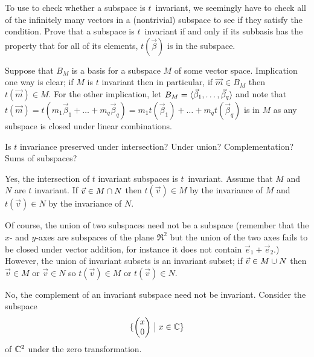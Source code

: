\begin{exercises}
    To use  to check whether a subspace
    is $t$~invariant, we seemingly have to check all of the infinitely many
    vectors in a (nontrivial) subspace to see if they satisfy the condition.
    Prove that a subspace is \( t \)~invariant if and only if its subbasis
    has the property that for all of its elements, $t(\vec{\beta})$ is in 
    the subspace.
    \begin{answer}
      Suppose that \( B_M \) is a basis for a subspace \( M \) of some vector
      space.
      Implication one way is clear; if \( M \) is \( t \) invariant then
      in particular, if \( \vec{m}\in B_M \) then \( t(\vec{m})\in M \).
      For the other implication, let
      \( B_M=\langle\vec{\beta}_1,\dots,\vec{\beta}_q\rangle \) and note that
      \( t(\vec{m})=t(m_1\vec{\beta}_1+\dots+m_q\vec{\beta}_q)
                   =m_1t(\vec{\beta}_1)+\dots+m_qt(\vec{\beta}_q) \)
      is in \( M \) as any subspace is closed under linear
      combinations. 
    \end{answer}
  \recommended \item 
    Is \( t \) invariance preserved under intersection?
    Under union?
    Complementation?
    Sums of subspaces?
    \begin{answer}
      Yes, the intersection 
      of $t$ invariant subspaces is $t$~invariant.
      Assume that \( M \) and \( N \) are \( t \) invariant.
      If \( \vec{v}\in M\cap N \) then \( t(\vec{v})\in M \)
      by the invariance of \( M \) and \( t(\vec{v})\in N \) by the
      invariance of \( N \).

      Of course, the union of two subspaces need not be a subspace
      (remember that the $x$-\hbox{} and $y$-axes are subspaces of the plane
      $\Re^2$ but the union of the two axes fails to be closed
      under vector addition, for instance it does not contain
      $\vec{e}_1+\vec{e}_2$.)
      However, the union of invariant subsets is an invariant subset; if
      \( \vec{v}\in M\cup N \) then \( \vec{v}\in M \) or \( \vec{v}\in N \)
      so \( t(\vec{v})\in M \) or \( t(\vec{v})\in N \).

      No, the complement of an invariant subspace need not be invariant.
      Consider the subspace
      \begin{equation*}
        \mbox{$\{\begin{pmatrix} x \\ 0 \end{pmatrix}\bigm| x\in\mathbb{C}\}$}
      \end{equation*}
      of \( \mathbb{C}^2 \) under the zero transformation.


\end{answer}
\end{exercises}
